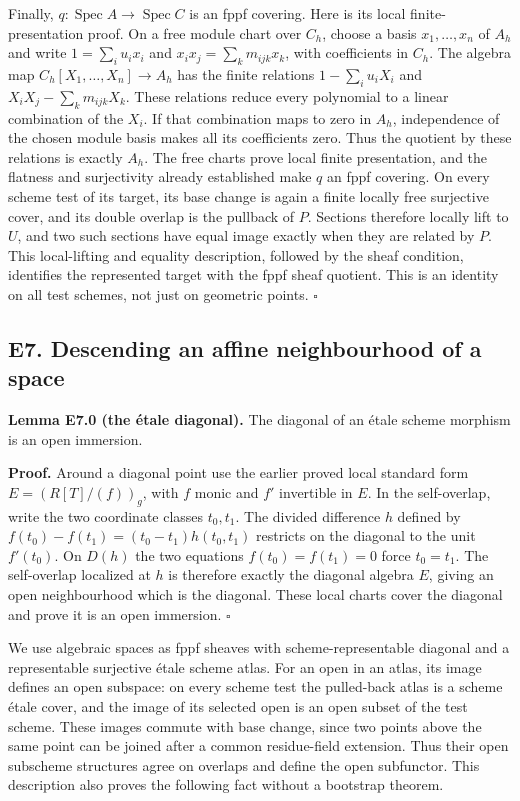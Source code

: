\documentclass[11pt,a4paper,openany]{report}
\begin{document}
Finally, \(q:\operatorname{Spec}A\to\operatorname{Spec}C\) is an fppf covering. Here is its local finite-presentation proof. On a free module chart over \(C_h\), choose a basis \(x_1,\ldots,x_n\) of \(A_h\) and write \(1=\sum_i u_i x_i\) and \(x_i x_j=\sum_k m_{ijk}x_k\), with coefficients in \(C_h\). The algebra map \(C_h[X_1,\ldots,X_n]\to A_h\) has the finite relations \(1-\sum_i u_iX_i\) and \(X_iX_j-\sum_k m_{ijk}X_k\). These relations reduce every polynomial to a linear combination of the \(X_i\). If that combination maps to zero in \(A_h\), independence of the chosen module basis makes all its coefficients zero. Thus the quotient by these relations is exactly \(A_h\). The free charts prove local finite presentation, and the flatness and surjectivity already established make \(q\) an fppf covering. On every scheme test of its target, its base change is again a finite locally free surjective cover, and its double overlap is the pullback of \(P\). Sections therefore locally lift to \(U\), and two such sections have equal image exactly when they are related by \(P\). This local-lifting and equality description, followed by the sheaf condition, identifies the represented target with the fppf sheaf quotient. This is an identity on all test schemes, not just on geometric points. \(\square\)

\subsection{E7. Descending an affine neighbourhood of a space}\label{AG-RG-S04-e7.-descending-an-affine-neighbourhood-of-a-space}

\textbf{Lemma E7.0 (the étale diagonal).} The diagonal of an étale scheme morphism is an open immersion.

\textbf{Proof.} Around a diagonal point use the earlier proved local standard form \(E=(R[T]/(f))_g\), with \(f\) monic and \(f'\) invertible in \(E\). In the self-overlap, write the two coordinate classes \(t_0,t_1\). The divided difference \(h\) defined by \(f(t_0)-f(t_1)=(t_0-t_1)h(t_0,t_1)\) restricts on the diagonal to the unit \(f'(t_0)\). On \(D(h)\) the two equations \(f(t_0)=f(t_1)=0\) force \(t_0=t_1\). The self-overlap localized at \(h\) is therefore exactly the diagonal algebra \(E\), giving an open neighbourhood which is the diagonal. These local charts cover the diagonal and prove it is an open immersion. \(\square\)

We use algebraic spaces as fppf sheaves with scheme-representable diagonal and a representable surjective étale scheme atlas. For an open in an atlas, its image defines an open subspace: on every scheme test the pulled-back atlas is a scheme étale cover, and the image of its selected open is an open subset of the test scheme. These images commute with base change, since two points above the same point can be joined after a common residue-field extension. Thus their open subscheme structures agree on overlaps and define the open subfunctor. This description also proves the following fact without a bootstrap theorem.
\end{document}
